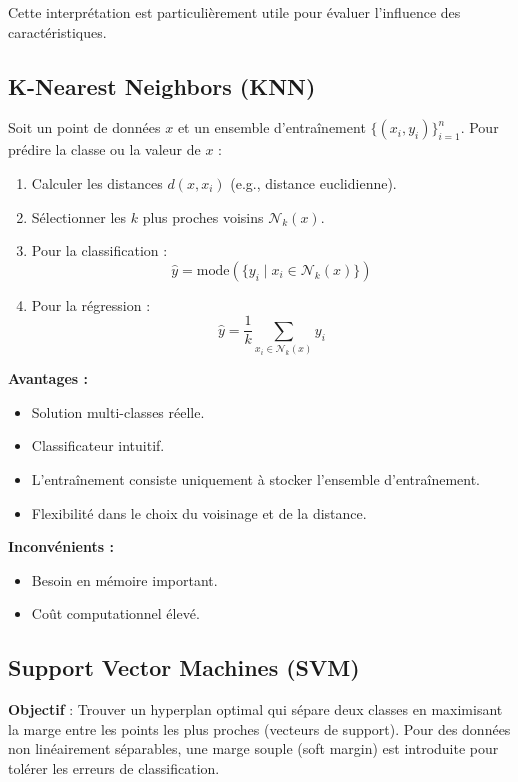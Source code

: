 \documentclass[a4paper,portrait]{article}
\begin{document}
\begin{multicols}{2}
Cette interprétation est particulièrement utile pour évaluer l'influence des caractéristiques.

\subsection{K-Nearest Neighbors (KNN)}
Soit un point de données \( x \) et un ensemble d'entraînement \( \{(x_i, y_i)\}_{i=1}^n \). Pour prédire la classe ou la valeur de \( x \) :
\begin{enumerate}
    \item Calculer les distances \( d(x, x_i) \) (e.g., distance euclidienne).
    \item Sélectionner les \( k \) plus proches voisins \( \mathcal{N}_k(x) \).
    \item Pour la classification : 
        \[
        \hat{y} = \text{mode}(\{y_i \mid x_i \in \mathcal{N}_k(x)\})
        \]
    \item Pour la régression :
        \[
        \hat{y} = \frac{1}{k} \sum_{x_i \in \mathcal{N}_k(x)} y_i
        \]
\end{enumerate}

\textbf{Avantages :}
\begin{itemize}
    \item Solution multi-classes réelle.
    \item Classificateur intuitif.
    \item L'entraînement consiste uniquement à stocker l'ensemble d'entraînement.
    \item Flexibilité dans le choix du voisinage et de la distance.
\end{itemize}

\textbf{Inconvénients :}
\begin{itemize}
    \item Besoin en mémoire important.
    \item Coût computationnel élevé.
\end{itemize}

\subsection{Support Vector Machines (SVM)}

\textbf{Objectif} : Trouver un hyperplan optimal qui sépare deux classes en maximisant la marge entre les points les plus proches (vecteurs de support). Pour des données non linéairement séparables, une marge souple (soft margin) est introduite pour tolérer les erreurs de classification.


\end{multicols}
\end{document}
